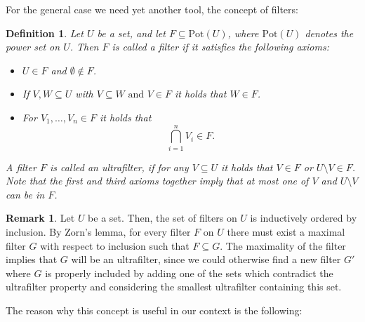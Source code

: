 \documentclass{article}
\theoremstyle{plain}
\newtheorem{defn}[Satz]{Definition}
\theoremstyle{definition}
\newtheorem{rem}[Satz]{Remark}
\begin{document}
For the general case we need yet another tool, the concept of filters:

\begin{defn}
Let $U$ be a set, and let $F \subseteq \text{Pot}(U)$, where $\text{Pot}(U)$ denotes the power set on $U$. Then $F$ is called a \emph{filter} if it satisfies the following axioms: 
\begin{itemize}
\item  $U \in F$ and $\emptyset \notin F$.
\item If $V,W \subseteq U$ with $V \subseteq W \text{ and }V  \in F $ it holds that $W \in F$.
\item For $V_1, \ldots, V_n \in F$ it holds that \[ \bigcap_{i = 1}^n V_i \in F. \]
\end{itemize}
A filter $F$ is called an \emph{ultrafilter}, if for any $V \subseteq U$ it holds that $V \in F$ or $U \setminus V \in F$. Note that the first and third axioms together imply that at most one of $V$ and $U \setminus V$ can be in $F$.
\end{defn}



\begin{rem}
Let $U$ be a set. Then, the set of filters on $U$ is inductively ordered by inclusion. By Zorn's lemma, for every filter $F$ on $U$ there must exist a maximal filter $G$ with respect to inclusion such that $F \subseteq G$.
The maximality of the filter implies that $G$ will be an ultrafilter, since we could otherwise find a new filter $G'$ where $G$ is properly included by adding one of the sets which contradict the ultrafilter property and considering the smallest ultrafilter containing this set.
\end{rem}

The reason why this concept is useful in our context is the following:
\end{document}
